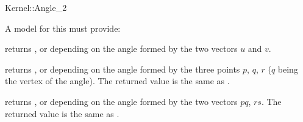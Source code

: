 \begin{ccRefFunctionObjectConcept}{Kernel::Angle_2}


A model for this must provide:


{returns ,  or  depending
on the angle formed by the two vectors $u$ and $v$.}

{returns ,  or  depending
on the angle formed by the three points $p$, $q$, $r$ ($q$ being the vertex of
the angle). The returned value is the same as .}

{returns ,  or  depending
on the angle formed by the two vectors $pq$, $rs$. The returned value is
the same as .}

\ccSeeAlso
{}  \\

\end{ccRefFunctionObjectConcept}
